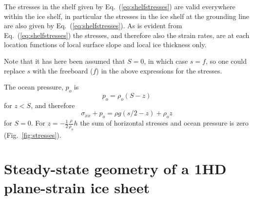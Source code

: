 \documentclass[10pt,a4paper]{book}
\newcommand{\p}{\partial}
\begin{document}
The stresses in the shelf given by Eq.~(\ref{eq:shelfstresses}) are valid everywhere within the ice
shelf, in particular the stresses in the ice shelf at the grounding line are also given by
Eq.~(\ref{eq:shelfstresses}). As is evident from Eq.~(\ref{eq:shelfstresses}) the stresses,
and therefore also the strain rates, are at each location functions of local surface slope and local
ice thickness only.

Note that it has here been assumed that $S=0$, in which case $s=f$, so
one could replace $s$ with the freeboard ($f$) in the above
expressions for the stresses.


The ocean pressure, $p_o$ is
\[
 p_o=  \rho_o (S-z)
\]
for $z<S$, and therefore
\[
 \sigma_{xx}+p_o= \rho g (s/2-z) + \rho_o z
\]
for $S=0$. For $z=-\frac{1}{2} \frac{\rho}{\rho_o} h$ the sum of
horizontal stresses and ocean pressure is zero
(Fig.~\ref{fig:stresses}).



% 
% 
% 
% 
% 
% 
% 

\section{Steady-state geometry of a 1HD plane-strain ice sheet}
\end{document}
